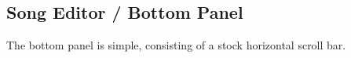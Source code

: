 \subsection{Song Editor / Bottom Panel}
\label{subsec:song_editor_bottom}

   The bottom panel is simple, consisting of a stock horizontal scroll bar.

\begin{comment}

   ...and a small button, called the \textbf{Grow} button, labelled with a
   "\textbf{$>$}".
   \index{grow button}
   \index{song editor!grow}
   The \textbf{Grow} button adds to the number of measures that exist
   in the song editor. The visual effect is very subtle, resulting only
   in a small change in the thumb of the horizontal scroll-bar, unless one
   is at the right end of the piano roll.  Then, one can see the added
   measures.  Usually about 128 at a time are added, but this depends on the
   value of PPQN in force.

\end{comment}

